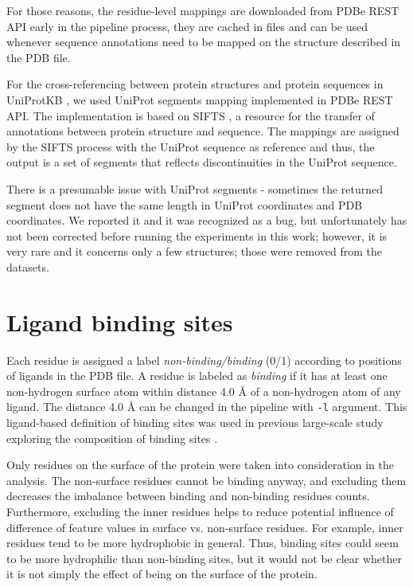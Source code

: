 For those reasons, the residue-level mappings are downloaded from PDBe REST API \cite{pdbe_restapi} early in the pipeline process, they are cached in files and can be used whenever sequence annotations need to be mapped on the structure described in the PDB file.

For the cross-referencing between protein structures and protein sequences in UniProtKB \cite{uniprot}, we used UniProt segments mapping implemented in PDBe REST API. The implementation is based on SIFTS \cite{sifts}, a resource for the transfer of annotations between protein structure and sequence. The mappings are assigned by the SIFTS process with the UniProt sequence as reference and thus, the output is a set of segments that reflects discontinuities in the UniProt sequence.

There is a presumable issue with UniProt segments - sometimes the returned segment does not have the same length in UniProt coordinates and PDB coordinates. We reported it and it was recognized as a bug, but unfortunately has not been corrected before running the experiments in this work; however, it is very rare and it concerns only a few structures; those were removed from the datasets. 

\section{Ligand binding sites}

Each residue is assigned a label \textit{non-binding/binding} (0/1) according to positions of ligands in the PDB file. A residue is labeled as \textit{binding} if it has at least one non-hydrogen surface atom within distance 4.0 {\AA} of a non-hydrogen atom of any ligand. The distance 4.0 {\AA} can be changed in the pipeline with \texttt{-l} argument. This ligand-based definition of binding sites was used in previous large-scale study exploring the composition of binding sites \cite{lbscomposition}.

Only residues on the surface of the protein were taken into consideration in the analysis. The non-surface residues cannot be binding anyway, and excluding them decreases the imbalance between binding and non-binding residues counts. Furthermore, excluding the inner residues helps to reduce potential influence of difference of feature values in surface vs. non-surface residues. For example, inner residues tend to be more hydrophobic in general. Thus, binding sites could seem to be more hydrophilic than non-binding sites, but it would not be clear whether it is not simply the effect of being on the surface of the protein.

